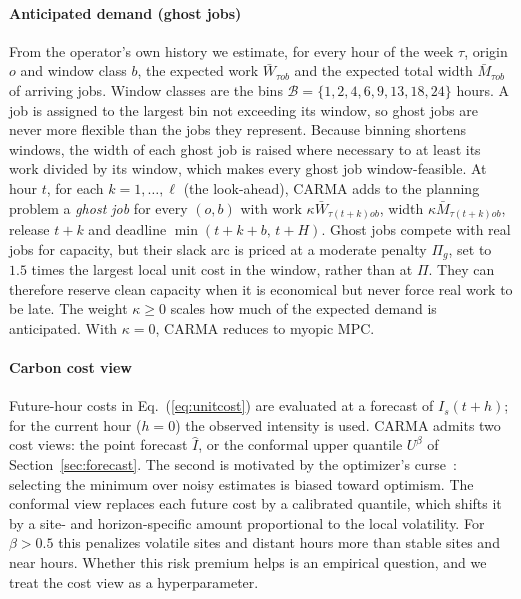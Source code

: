 \paragraph{Anticipated demand (ghost jobs)} From the operator's own history we estimate, for every hour of the week $\tau$, origin $o$ and window class $b$, the expected work $\bar W_{\tau ob}$ and the expected total width $\bar M_{\tau ob}$ of arriving jobs. Window classes are the bins $\mathcal{B}=\{1,2,4,6,9,13,18,24\}$ hours. A job is assigned to the largest bin not exceeding its window, so ghost jobs are never more flexible than the jobs they represent. Because binning shortens windows, the width of each ghost job is raised where necessary to at least its work divided by its window, which makes every ghost job window-feasible. At hour $t$, for each $k=1,\dots,\ell$ (the look-ahead), CARMA adds to the planning problem a \emph{ghost job} for every $(o,b)$ with work $\kappa\bar W_{\tau(t+k)ob}$, width $\kappa\bar M_{\tau(t+k)ob}$, release $t+k$ and deadline $\min(t+k+b,\,t+H)$. Ghost jobs compete with real jobs for capacity, but their slack arc is priced at a moderate penalty $\Pi_g$, set to $1.5$ times the largest local unit cost in the window, rather than at $\Pi$. They can therefore reserve clean capacity when it is economical but never force real work to be late. The weight $\kappa\ge 0$ scales how much of the expected demand is anticipated. With $\kappa=0$, CARMA reduces to myopic MPC.

\paragraph{Carbon cost view} Future-hour costs in Eq.~(\ref{eq:unitcost}) are evaluated at a forecast of $I_s(t+h)$; for the current hour ($h=0$) the observed intensity is used. CARMA admits two cost views: the point forecast $\hat I$, or the conformal upper quantile $U^{\beta}$ of Section~\ref{sec:forecast}. The second is motivated by the optimizer's curse~\cite{smith2006optimizer}: selecting the minimum over noisy estimates is biased toward optimism. The conformal view replaces each future cost by a calibrated quantile, which shifts it by a site- and horizon-specific amount proportional to the local volatility. For $\beta>0.5$ this penalizes volatile sites and distant hours more than stable sites and near hours. Whether this risk premium helps is an empirical question, and we treat the cost view as a hyperparameter.

